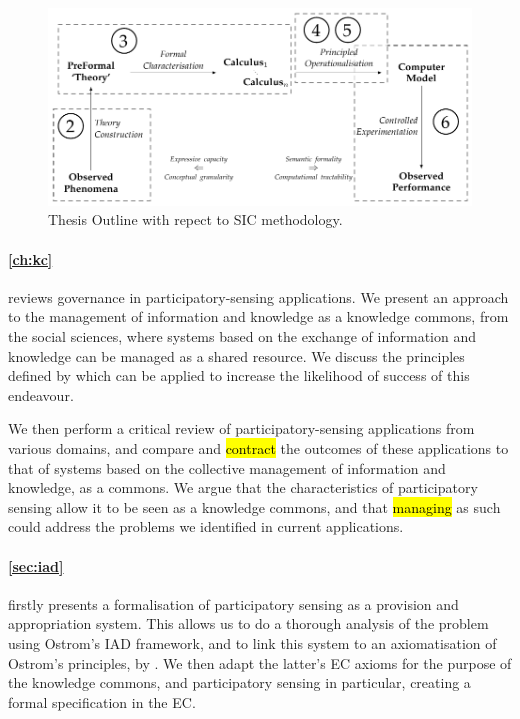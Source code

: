 \begin{figure}
\includegraphics[width=\linewidth]{gfx/intro/sic_chapters}
\caption{Thesis Outline with repect to \acl{SIC} methodology.}\label{fig:sicoutline}
\end{figure}

\paragraph{\autoref{ch:kc}}
reviews governance in participatory-sensing
applications. We present an approach to the management of information and knowledge as a knowledge commons, from
the social sciences, where systems based on the exchange of
information and knowledge can be managed as a shared resource. We discuss the
principles defined by \citet{Ostrom1990} which can be applied to increase the
likelihood of success of this endeavour. 

We then perform a critical review of participatory-sensing applications from
various domains, and compare and \hl{contract} the outcomes of these applications
to that of systems based on the collective management of information and
knowledge, as a commons. We argue that the characteristics of participatory
sensing allow it to be seen as a knowledge commons, and that \hl{managing} as such
could address the problems we identified in current applications.

\paragraph{\autoref{sec:iad}}
firstly presents a formalisation of participatory sensing as a provision and
appropriation system. This allows us to do a thorough
analysis of the problem using Ostrom's \ac{IAD} framework, and to link this
system to an axiomatisation of Ostrom's principles, by \citet{Pitt2012b}.
We then adapt the latter's \ac{EC} axioms for the purpose of the
knowledge commons, and participatory sensing in particular, creating a formal specification in the \ac{EC}.

